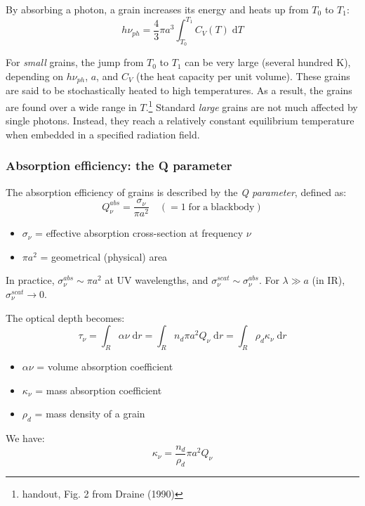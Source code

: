 \documentclass[11pt]{article}
\newcommand{\mar}[1]{\hspace{0pt}\marginpar{-\textcolor{black}{#1}-}}
\begin{document}
By absorbing a photon, a grain increases its energy and heats up from
$T_{0}$ to $T_{1}$:
\[
    h\nu_{ph} = \frac{4}{3}{\pi}a^{3} \int_{T_{0}}^{T_{1}} {\!
        C_{V} (T) \;\mathrm{d}T }
    \]

For \emph{small} grains, the jump from $T_{0}$ to $T_{1}$ can be very large
(several hundred K), depending on $h\nu_{ph}$, $a$, and $C_{V}$ (the heat
capacity per unit volume). These grains are said to be stochastically heated to
high temperatures. As a result, the grains are found over a wide range in
$T$.\footnote{handout, Fig. 2 from Draine (1990)} Standard \emph{large} grains
are not much affected by single photons. Instead, they reach a relatively
constant equilibrium temperature when embedded in a specified radiation field.

\subsubsection{Absorption efficiency: the Q parameter}
The absorption efficiency of grains is described by the \textit{Q parameter},
defined as:
\[
    Q_{\nu}^{abs}
    = \frac{\sigma_{\nu}}{{\pi}a^{2}}
    \quad
    (= 1 \;\mathrm{for\;a\;blackbody})
    \]
\begin{itemize}[label={}]
    \item $\sigma_{\nu}$ = effective absorption cross-section at frequency
        $\nu$
    \item ${\pi}a^{2}$ = geometrical (physical) area
\end{itemize}
In practice, $\sigma_{\nu}^{abs} \sim {\pi}a^{2} $
at UV wavelengths, and $\sigma_{\nu}^{scat} \sim \sigma_{\nu}^{abs}$.
For $\lambda \gg a$ (in IR), $\sigma_{\nu}^{scat} \rightarrow 0$.

\mar{106}The optical depth becomes:
\[
    \tau_{\nu}
    = \int_{R}{ \alpha{\nu} \;\mathrm{d}r}
    = \int_{R}{ n_{d} \pi a^{2} Q_{\nu} \;\mathrm{d}r}
    = \int_{R}{ \rho_{d}\kappa_{\nu} \;\mathrm{d}r}
    \]
\begin{itemize}
    \item $\alpha{\nu}$ = volume absorption coefficient
    \item $\kappa_{\nu}$ = mass absorption coefficient
    \item $\rho_{d}$ = mass density of a grain
\end{itemize}
We have:
\[
    \kappa_{\nu} = \frac{n_{d}}{\rho_{d}} \pi a^{2} Q_{\nu}
    \]
\end{document}
